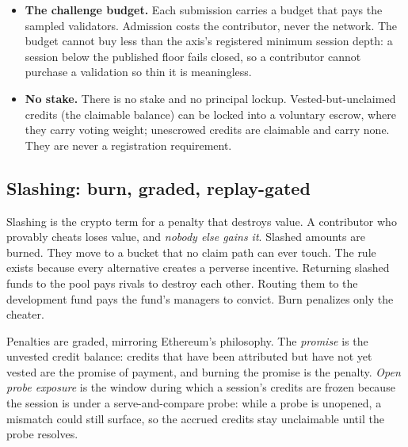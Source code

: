 \documentclass[11pt]{article}
\begin{document}
\begin{itemize}
          developer's posted reference hosting cost, times a registered
          conservatism factor, an estimate that over-sizes the bond and
          never under-sizes it. The bond is forfeited
          on conviction and returned in full otherwise. Bonds are economic:
          they require no identity.
    \item \textbf{The challenge budget.} Each submission carries a
          budget that pays the sampled validators. Admission costs the
          contributor, never the network. The budget cannot buy less than
          the axis's registered minimum session depth: a session below the
          published floor fails closed, so a contributor cannot purchase a
          validation so thin it is meaningless.
    \item \textbf{No stake.} There is no stake and no principal
          lockup. Vested-but-unclaimed credits (the claimable balance)
          can be locked into a voluntary escrow, where they carry voting
          weight; unescrowed credits are claimable and carry none. They
          are never a registration requirement.
\end{itemize}

\subsection{Slashing: burn, graded, replay-gated}

Slashing is the crypto term for a penalty that destroys value. A
contributor who provably cheats loses value, and \emph{nobody else
    gains it}. Slashed amounts are burned. They move to a bucket that
no claim path can ever touch. The rule exists because every
alternative creates a perverse incentive. Returning slashed funds
to the pool pays rivals to destroy each other. Routing them to the
development fund pays the fund's managers to convict. Burn
penalizes only the cheater.

Penalties are graded, mirroring Ethereum's philosophy. The
\emph{promise} is the unvested credit balance: credits that have
been attributed but have not yet vested are the promise of
payment, and burning the promise is the penalty. \emph{Open probe
    exposure} is the window during which a session's credits are
frozen because the session is under a serve-and-compare probe:
while a probe is unopened, a mismatch could still surface, so the
accrued credits stay unclaimable until the probe resolves.
\end{document}
